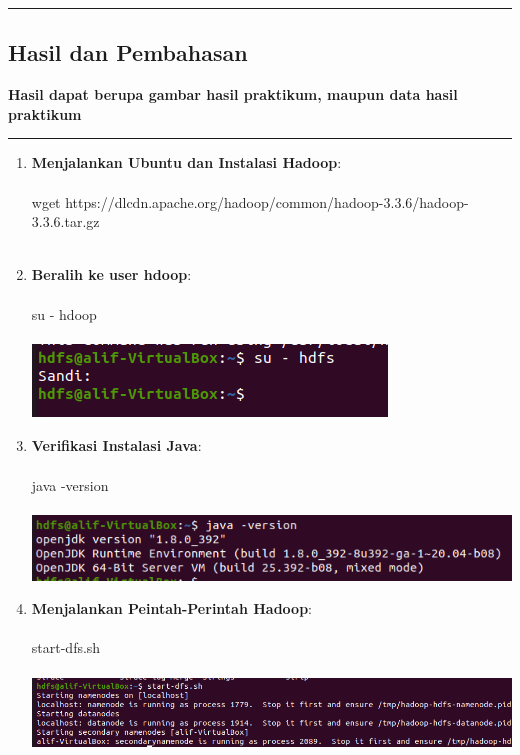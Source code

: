 {\color{gray}\hrule}
\begin{center}
\section{Hasil dan Pembahasan}
\textbf{Hasil dapat berupa gambar hasil praktikum, maupun data hasil praktikum}
\end{center}
{\color{gray}\hrule}
\begin{enumerate}

\item \textbf {Menjalankan Ubuntu dan Instalasi Hadoop}: \\ \\
    	\colorbox{BurntOrange}{wget https://dlcdn.apache.org/hadoop/common/hadoop-3.3.6/hadoop-3.3.6.tar.gz} \\ \\
    	
    	
\item \textbf {Beralih ke user hdoop}: \\ \\
\colorbox{BurntOrange}{su - hdoop} \\ \\
\includegraphics[scale=.6]{Gambar/satu} \\
    	
\item \textbf {Verifikasi Instalasi Java}: \\ \\
\colorbox{BurntOrange}{java -version} \\ \\
\includegraphics[scale=.6]{Gambar/dua} \\
    	
\item \textbf {Menjalankan Peintah-Perintah Hadoop}: \\ \\
\colorbox{BurntOrange}{start-dfs.sh} \\ \\
\includegraphics[scale=.5]{Gambar/tiga} \\
    	

\end{enumerate}
